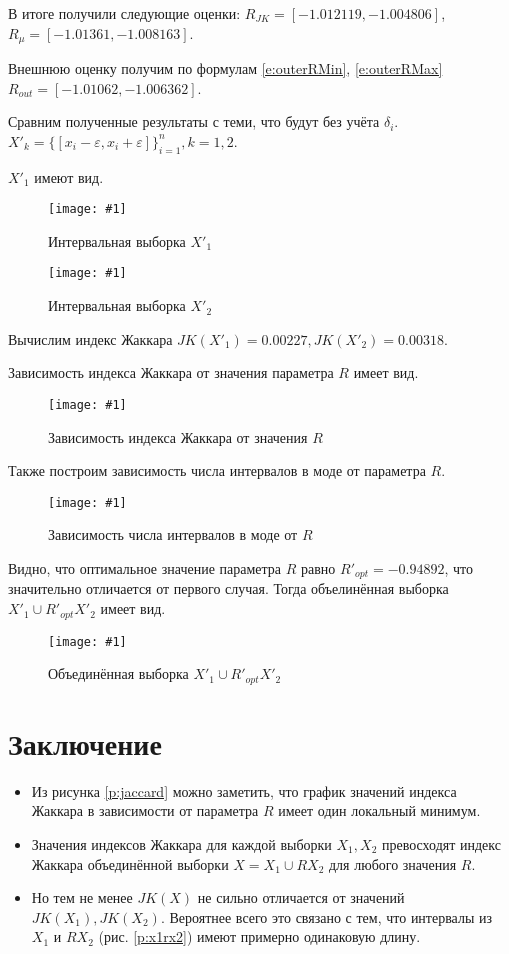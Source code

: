 \documentclass[a4paper,12pt]{article}
\newcommand{\plot}[3]{
    \begin{figure}[H]
        \begin{center}
            \texttt{[image: \#1]}
            \caption{#2}
            \label{#3}
        \end{center}
    \end{figure}
}
\begin{document}
    В итоге получили следующие оценки: $ R_{JK} = [-1.012119, -1.004806] $,
    $ R_{\mu} = [-1.01361, -1.008163] $.

    Внешнюю оценку получим по формулам \ref{e:outerRMin}, \ref{e:outerRMax}
    $ R_{out} = [-1.01062, -1.006362] $.

    Сравним полученные результаты с теми, что будут без учёта $ \delta_i $.
    $ X'_k = \{[x_i - \varepsilon, x_i + \varepsilon]\}^n_{i=1}, k = 1,2 $.

    $ X'_1 $ имеют вид.
    \plot{werr_X1}{Интервальная выборка $ X'_1 $}{p:werrX1}
    \plot{werr_X2}{Интервальная выборка $ X'_2 $}{p:werrX2}
    Вычислим индекс Жаккара $ JK(X'_1) = 0.00227, JK(X'_2) = 0.00318 $.

    Зависимость индекса Жаккара от значения параметра $ R $ имеет вид.
    \plot{werr_Jaccard}{Зависимость индекса Жаккара от значения $ R $}{p:werrJaccard}

    Также построим зависимость числа интервалов в моде от параметра $ R $.
    \plot{werr_ModaR}{Зависимость числа интервалов в моде от $ R $}{p:werrModa}

    Видно, что оптимальное значение параметра $ R $ равно $ R'_{opt} = -0.94892 $,
    что значительно отличается от первого случая.
    Тогда объелинённая выборка $ X'_1 \cup R'_{opt} X'_2 $ имеет вид.
    \plot{werr_X1RX2}{Объединённая выборка $ X'_1 \cup R'_{opt} X'_2 $}{p:werrX1RX2}

    \section{Заключение}
    \begin{itemize}
    \item Из рисунка \ref{p:jaccard} можно заметить, что график значений индекса Жаккара в зависимости от параметра $ R $ имеет один локальный минимум.
    \item Значения индексов Жаккара для каждой выборки $ X_1, X_2 $ превосходят индекс Жаккара объединённой выборки $ X = X_1 \cup R X_2 $ для любого значения $ R $.
    \item Но тем не менее $ JK(X) $ не сильно отличается от значений $ JK(X_1), JK(X_2) $. Вероятнее всего это связано с тем, что интервалы из $ X_1 $ и $ R X_2 $
    (рис. \ref{p:x1rx2}) имеют примерно одинаковую длину.
    \end{itemize}
\end{document}
